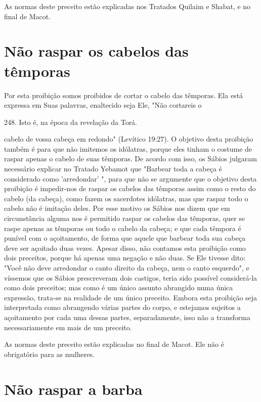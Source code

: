 \begin{itemize}
\begin{enumrate}
\begin{itemize}
\begin{itemize}
\begin{itemize}
As normas deste preceito estão explicadas nos Tratados Quilaim e Shabat,
e no final de Macot.

\section{Não raspar os cabelos das têmporas}

Por esta proibição somos proibidos de cortar o cabelo das têmpo­ras. Ela
está expressa em Suas palavras, enaltecido seja Ele, "Não cortareis o

248. Isto é, na época da revelação da Torá.

cabelo de vossa cabeça em redondo" (Levítico 19:27). O objetivo desta
proibi­ção também é para que não imitemos os idólatras, porque eles
tinham o costu­me de raspar apenas o cabelo de suas têmporas. De acordo
com isso, os Sábios julgaram necessário explicar no Tratado Yebamot que
"Barbear toda a cabeça é considerado como 'arredondar' ", para que não
se argumente que o objetivo desta proibição é impedir-nos de raspar os
cabelos das têmporas assim como o resto do cabelo (da cabeça), como
fazem os sacerdotes idólatras, mas que ras­par todo o cabelo não é
imitação deles. Por esse motivo os Sábios nos dizem que em circunstância
alguma nos é permitido raspar os cabelos das têmporas, quer se raspe
apenas as têmporas ou todo o cabelo da cabeça; e que cada têm­pora é
punível com o açoitamento, de forma que aquele que barbear toda sua
cabeça deve ser açoitado duas vezes. Apesar disso, não contamos esta
proibi­ção como dois preceitos, porque há apenas uma negação e não duas.
Se Ele tivesse dito: "Você não deve arredondar o canto direito da
cabeça, nem o can­to esquerdo", e víssemos que os Sábios prescreveram
dois castigos, teria sido possível considerá-la como dois preceitos; mas
como é um único assunto abran­gido numa única expressão, trata-se na
realidade de um único preceito. Embo­ra esta proibição seja interpretada
como abrangendo várias partes do corpo, e estejamos sujeitos a
açoitamento por cada uma dessas partes, separadamente, isso não a
transforma necessariamente em mais de um preceito.

As normas deste preceito estão explicadas no final de Macot. Ele não é
obrigatório para as mulheres.

\section{Não raspar a barba}


\end{itemize}
\end{itemize}
\end{itemize}
\end{enumrate}
\end{itemize}
